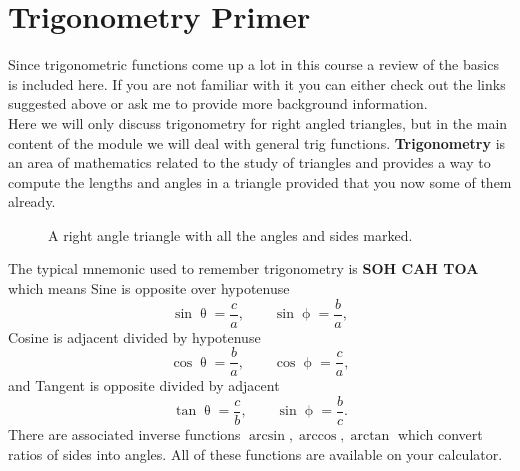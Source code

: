 \section{Trigonometry Primer}
Since trigonometric functions come up a lot in this course a review of the basics is included here. If you are not familiar with it you can either check out the links suggested above or ask me to provide more background information.\\

Here we will only discuss trigonometry for right angled triangles, but in the main content of the module we will deal with general trig functions. \textbf{Trigonometry} is an area of mathematics related to the study of triangles and provides a way to compute the lengths and angles in a triangle provided that you now some of them already.

\begin{figure}[ht]
    \centering
    \caption{A right angle triangle with all the angles and sides marked.}
    \label{fig: Trig definitions}
\end{figure}

The typical mnemonic used to remember trigonometry is \textbf{SOH CAH TOA} which means Sine is opposite over hypotenuse
\begin{equation*}
\sin\uptheta=\frac{c}{a}, \qquad \sin\upphi =\frac{b}{a},
\end{equation*}
Cosine is adjacent divided by hypotenuse
\begin{equation*}
\cos\uptheta=\frac{b}{a}, \qquad \cos\upphi =\frac{c}{a},
\end{equation*}
and Tangent is opposite divided by adjacent
\begin{equation*}
\tan\uptheta=\frac{c}{b}, \qquad \sin\upphi =\frac{b}{c}.
\end{equation*}
There are associated inverse functions $\arcsin,\arccos,\arctan$ which convert ratios of sides into angles. All of these functions are available on your calculator. \\

